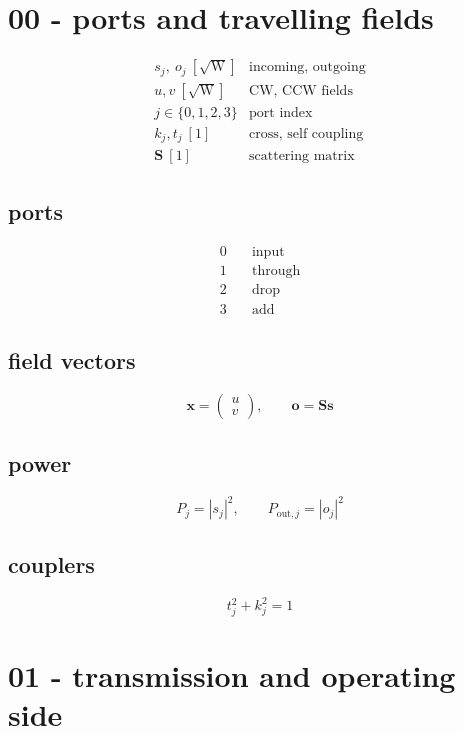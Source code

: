\section*{00 - ports and travelling fields}

\[
\begin{array}{ll}s_j,\ o_j\ [\sqrt{\mathrm W}]&\text{incoming, outgoing}\\[0.6em]u,v\ [\sqrt{\mathrm W}]&\text{CW, CCW fields}\\[0.6em]j\in\{0,1,2,3\}&\text{port index}\\[0.6em]k_j,t_j\ [1]&\text{cross, self coupling}\\[0.6em]\mathbf S\ [1]&\text{scattering matrix}\end{array}
\]

\subsection*{ports}
\[
\displaystyle \begin{aligned}0&\quad\text{input}\\1&\quad\text{through}\\2&\quad\text{drop}\\3&\quad\text{add}\end{aligned}
\]

\subsection*{field vectors}
\[
\displaystyle \mathbf x=\begin{pmatrix}u\\v\end{pmatrix},\qquad \mathbf o=\mathbf S\mathbf s
\]

\subsection*{power}
\[
\displaystyle P_j=|s_j|^2,\qquad P_{\mathrm{out},j}=|o_j|^2
\]

\subsection*{couplers}
\[
\displaystyle t_j^2+k_j^2=1
\]

\clearpage
\section*{01 - transmission and operating side}

